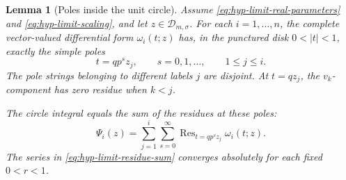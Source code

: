 \documentclass[12pt]{amsart}
\newtheorem{lem}[thm]{Lemma}
\theoremstyle{definition}
\numberwithin{equation}{section}
\theoremstyle{definition}
\let\mc\mathcal
\let\si\sigma
\let\om\omega
\let\le\leqslant
\let\on\operatorname
\def\Res{\on{Res}}
\def\beq{\begin{equation}}
\def\eeq{\end{equation}}
\begin{document}
\begin{lem}[Poles inside the unit circle]
\label{lem:hyp-inward-poles}
Assume \eqref{eq:hyp-limit-real-parameters} and
\eqref{eq:hyp-limit-scaling}, and let
$z\in\mc D_{m,\si}$. For each $i=1,\ldots,n$, the
complete vector-valued differential form $\om_i(t;z)$ has,
in the punctured disk $0<|t|<1$, exactly the simple poles
\beq\label{eq:hyp-limit-strings}
 t=qp^s z_j,\qquad s=0,1,\ldots,\qquad 1\le j\le i.
\eeq
The pole strings belonging to different labels $j$ are
disjoint. At $t=qz_j$, the $v_k$-component has zero residue
when $k<j$.

The circle integral equals the sum of the residues at
these poles:
\beq\label{eq:hyp-limit-residue-sum}
 \Psi_i(z)=\sum_{j=1}^i\sum_{s=0}^\infty
 \Res_{t=qp^sz_j}\om_i(t;z).
\eeq
The series in \eqref{eq:hyp-limit-residue-sum} converges
absolutely for each fixed $0<r<1$.
\end{lem}
\end{document}
